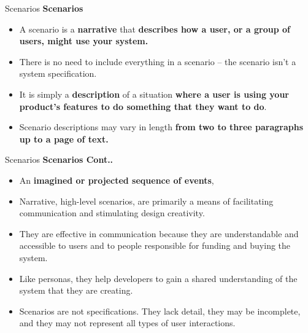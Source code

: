 \documentclass{beamer}
\begin{document}
\begin{frame}{Scenarios}
	\textbf{Scenarios}
	\begin{itemize}
		\item A scenario is a \textbf{narrative} that \textbf{describes how a user, or a group of users, might use your system. }
		\item There is no need to include everything in a scenario – the scenario isn’t a system specification. 
		\item It is simply a \textbf{description} of a situation \textbf{where a user is using your product’s features to do something that they want to do}.
		\item Scenario descriptions may vary in length \textbf{from two to three paragraphs up to a page of text.}
		
	\end{itemize}
	
\end{frame}
\begin{frame}{Scenarios}
	\textbf{Scenarios Cont..}
	\begin{itemize}
		\item An \textbf{imagined or projected sequence of events},
		\item Narrative, high-level scenarios, are primarily a means of facilitating 
		communication and stimulating design creativity. 
		\item They are effective in communication because they are 
		understandable and accessible to users and to people responsible for 
		funding and buying the system.
		\item Like personas, they help developers to gain a shared understanding of 
		the system that they are creating. 
		\item Scenarios are not specifications. They lack detail, they may be 
		incomplete, and they may not represent all types of user interactions.

	\end{itemize}
	
\end{frame}
\end{document}
